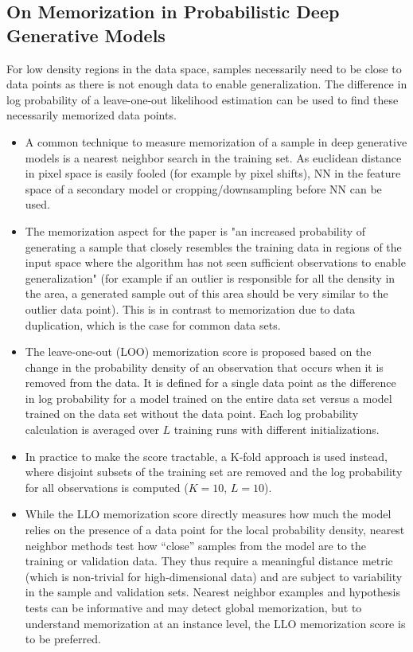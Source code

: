 \documentclass{article}
\begin{document}
\subsection{On Memorization in Probabilistic Deep Generative Models}
\begin{tldr}
    For low density regions in the data space, samples necessarily need to be close to data points as there is not enough data to enable generalization. The difference in log probability of a leave-one-out likelihood estimation can be used to find these necessarily memorized data points.
\end{tldr}
\begin{itemize}
    \item A common technique to measure memorization of a sample in deep generative models is a nearest neighbor search in the training set. As euclidean distance in pixel space is easily fooled (for example by pixel shifts), NN in the feature space of a secondary model or cropping/downsampling before NN can be used.
    \item The memorization aspect for the paper is "an increased probability of generating a sample that closely resembles the training data in regions of the input space where the algorithm has not seen sufficient observations to enable generalization" (for example if an outlier is responsible for all the density in the area, a generated sample out of this area should be very similar to the outlier data point). This is in contrast to memorization due to data duplication, which is the case for common data sets.
    \item The leave-one-out (LOO) memorization score is proposed based on the change in the probability density of an observation that occurs when it is removed from the data. It is defined for a single data point as the difference in log probability for a model trained on the entire data set versus a model trained on the data set without the data point. Each log probability calculation is averaged over $L$ training runs with different initializations. 
    \item In practice to make the score tractable, a K-fold approach is used instead, where disjoint subsets of the training set are removed and the log probability for all observations is computed ($K=10$, $L=10$).
    \item While the LLO memorization score directly measures how much the model relies on the presence of a data point for the local probability density, nearest neighbor methods test how “close” samples from the model are to the training or validation data. They thus require a meaningful distance metric (which is non-trivial for high-dimensional data) and are subject to variability in the sample and validation sets. Nearest neighbor examples and hypothesis tests can be informative and may detect global memorization, but to understand memorization at an instance level, the LLO memorization score is to be preferred.

\end{itemize}
\end{document}
